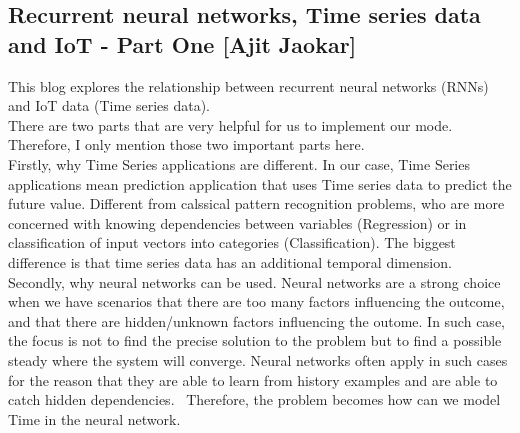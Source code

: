 \documentclass[12pt]{article}
\begin{document}
\subsection{Recurrent neural networks, Time series data and IoT - Part One [Ajit Jaokar]}
This blog \cite{RecurrentNeuralNetworksTimeSeriesData} explores the relationship between recurrent neural networks (RNNs) and IoT data (Time series data). \\
There are two parts that are very helpful for us to implement our mode. Therefore, I only mention those two important parts here. \\ Firstly, why Time Series applications are different. In our case, Time Series applications mean prediction application that uses Time series data to predict the future value. Different from calssical pattern recognition problems, who are more concerned with knowing dependencies between variables (Regression) or in classification of input vectors into categories (Classification). The biggest difference is that time series data has an additional temporal dimension. \\ Secondly, why neural networks can be used. Neural networks are a strong choice when we have scenarios that there are too many factors influencing the outcome, and that there are hidden/unknown factors influencing the outome. In such case, the focus is not to find the precise solution to the problem but to find a possible steady where the system will converge. Neural networks often apply in such cases for the reason that they are able to learn from history examples and are able to catch hidden dependencies. \ Therefore, the problem becomes how can we model Time in the neural network.
\end{document}
